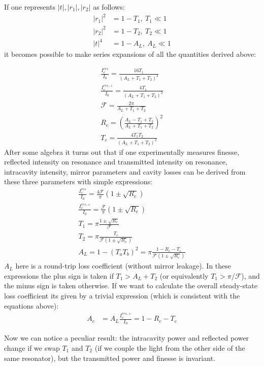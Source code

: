 \documentclass{article}
\numberwithin{equation}{section}
\begin{document}
If one represents $|t|, |r_1|, |r_2|$ as follows:
\begin{align}
    |r_1|^2 &= 1 - T_1 , ~ T_1 \ll 1\\
    |r_2|^2 &= 1 - T_2  , ~ T_2 \ll 1\\
    |t|^4 &= 1 - A_L , ~ A_L \ll 1
\end{align}
it becomes possible to make series expansions of all the quantities derived above:

\begin{gather}
    \frac{I_c^{res}}{I_0} = \frac{16 T_1}{(A_L + T_1 + T_2)^2} \\
    \frac{I_c^{res, +}}{I_0} = \frac{4 T_1}{(A_L + T_1 + T_2)^2} \\
    \mathcal{F} = \frac{2 \pi}{A_L + T_1 + T_2} \\
    R_c = \left( \frac{A_L - T_1 + T_2}{A_L + T_1 + T_2} \right)^2 \\
    T_c = \frac{4 T_1 T_2}{(A_L + T_1 + T_2)^2}
\end{gather}
After some algebra it turns out that if one experimentally measures finesse, reflected intensity on resonance and transmitted intensity on resonance, intracavity intensity, mirror parameters and cavity losses can be derived from these three parameters with simple expressions:
\begin{gather}
    \frac{I_c^{res}}{I_0} = \frac{4 \mathcal{F}}{\pi} (1 \pm \sqrt{R_c}) \\
    \frac{I_c^{res, +}}{I_0} = \frac{\mathcal{F}}{\pi} (1 \pm \sqrt{R_c}) \\
    T_1 = \pi \frac{1 \pm \sqrt{R_c}}{\mathcal{F}} \\
    T_2 = \pi \frac{T_c}{\mathcal{F} (1 \pm \sqrt{R_c})} \\
    A_{L} = 1 - (T_a T_b)^2 = \pi \frac{1-R_c-T_c}{\mathcal{F} (1 \pm \sqrt{R_c})}
\end{gather}
$A_{L}$ here is a round-trip loss coefficient (without mirror leakage). In these expressions the plus sign is taken if $T_1 > A_L + T_2$ (or equivalently $T_1 > \pi/\mathcal{F}$), and the minus sign is taken otherwise. If we want to calculate the overall steady-state loss coefficient its given by a trivial expression (which is consistent with the equations above):
\begin{align}
    A_c &= A_{L} \frac{I_c^{res, +}}{I_0} = 1 - R_c - T_c
\end{align}


Now we can notice a peculiar result: the intracavity power and reflected power change if we swap $T_1$ and $T_2$ (if we couple the light from the other side of the same resonator), but the transmitted power and finesse is invariant. 
\end{document}
